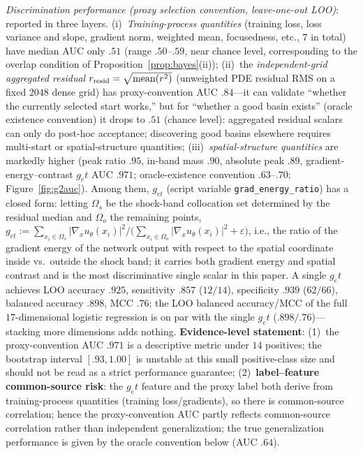 \documentclass[11pt]{article}
\numberwithin{equation}{section}
\begin{document}
\emph{Discrimination performance (proxy selection convention, leave-one-out LOO)}: reported in three layers. (i)~\emph{Training-process quantities} (training loss, loss variance and slope, gradient norm, weighted mean, focusedness, etc., $7$ in total) have median AUC only $.51$ (range $.50$--$.59$, near chance level, corresponding to the overlap condition of Proposition~\ref{prop:bayes}(ii)); (ii)~the \emph{independent-grid aggregated residual} $r_{\rm resid}=\sqrt{\operatorname{mean}(r^2)}$ (unweighted PDE residual RMS on a fixed $2048$ dense grid) has proxy-convention AUC $.84$---it can validate ``whether the currently selected start works,'' but for ``whether a good basin exists'' (oracle existence convention) it drops to $.51$ (chance level): aggregated residual scalars can only do post-hoc acceptance; discovering good basins elsewhere requires multi-start or spatial-structure quantities; (iii)~\emph{spatial-structure quantities} are markedly higher (peak ratio $.95$, in-band mass $.90$, absolute peak $.89$, gradient-energy--contrast $g_et$ AUC $.971$; oracle-existence convention $.63$--$.70$; Figure~\ref{fig:g2auc}). Among them, $g_{et}$ (script variable \texttt{grad\_energy\_ratio}) has a closed form: letting $\Omega_s$ be the shock-band collocation set determined by the residual median and $\Omega_o$ the remaining points, $g_{et}:=\sum_{x_i\in\Omega_s}|\nabla_x u_\theta(x_i)|^2\big/\bigl(\sum_{x_i\in\Omega_o}|\nabla_x u_\theta(x_i)|^2+\varepsilon\bigr)$, i.e., the ratio of the gradient energy of the network output with respect to the spatial coordinate inside vs.\ outside the shock band; it carries both gradient energy and spatial contrast and is the most discriminative single scalar in this paper. A single $g_et$ achieves LOO accuracy $.925$, sensitivity $.857$ ($12/14$), specificity $.939$ ($62/66$), balanced accuracy $.898$, MCC $.76$; the LOO balanced accuracy/MCC of the full $17$-dimensional logistic regression is on par with the single $g_et$ ($.898/.76$)---stacking more dimensions adds nothing. \textbf{Evidence-level statement}: (1)~the proxy-convention AUC $.971$ is a descriptive metric under $14$ positives; the bootstrap interval $[.93,1.00]$ is unstable at this small positive-class size and should not be read as a strict performance guarantee; (2)~\textbf{label--feature common-source risk}: the $g_et$ feature and the proxy label both derive from training-process quantities (training loss/gradients), so there is common-source correlation; hence the proxy-convention AUC partly reflects common-source correlation rather than independent generalization; the true generalization performance is given by the oracle convention below (AUC $.64$).
\end{document}

